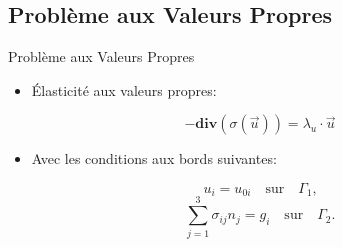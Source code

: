 \documentclass[french]{beamer}
\begin{document}
\subsection{Problème aux Valeurs Propres} 
\begin{frame}{Problème aux Valeurs Propres} 
  \begin{itemize}
     \item Élasticité aux valeurs propres:
  \end{itemize}
  

  \begin{equation}
   - \mathbf{div}  \left( \sigma \left(\vec{u}\right) \right) = \lambda_u \cdot \vec{u}
  \end{equation}
    \begin{itemize}
     \item Avec les conditions aux bords suivantes:
  \end{itemize}

\[u_i = u_{0i} \quad \text{sur} \quad \Gamma_1 \text{,} \]
\[\sum_{j=1}^3 \sigma_{ij} n_j  = g_i \quad \text{sur} \quad \Gamma_2 \text{.}\]
  
\end{frame}
\end{document}
